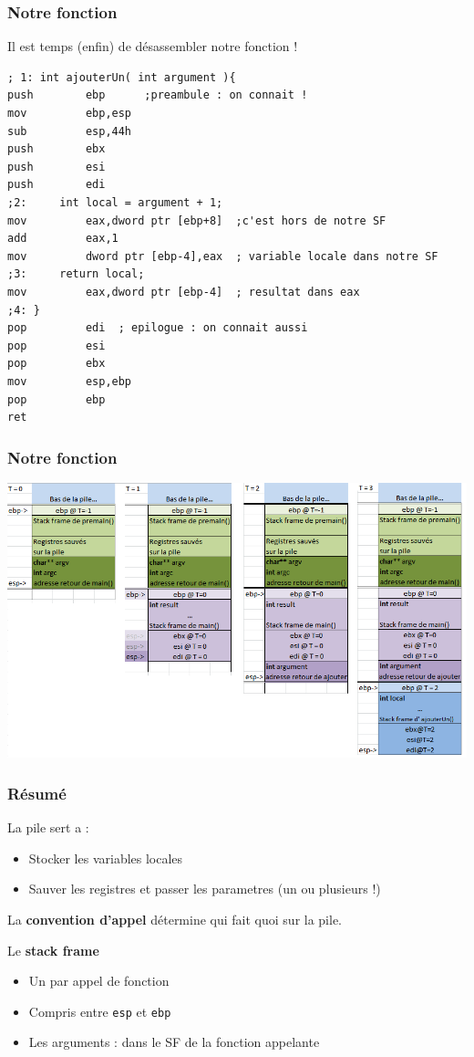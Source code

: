 \documentclass{beamer}
\begin{document}
\begin{frame}[fragile]
\frametitle{Notre fonction}
Il est temps (enfin) de désassembler notre fonction !
\begin{lstlisting}[language={[x86masm]Assembler}, basicstyle={\scriptsize\ttfamily}]
; 1: int ajouterUn( int argument ){
push        ebp      ;preambule : on connait !
mov         ebp,esp  
sub         esp,44h  
push        ebx  
push        esi  
push        edi  
;2: 	int local = argument + 1;
mov         eax,dword ptr [ebp+8]  ;c'est hors de notre SF
add         eax,1  
mov         dword ptr [ebp-4],eax  ; variable locale dans notre SF
;3: 	return local;
mov         eax,dword ptr [ebp-4]  ; resultat dans eax
;4: }
pop         edi  ; epilogue : on connait aussi
pop         esi  
pop         ebx  
mov         esp,ebp  
pop         ebp  
ret  
\end{lstlisting}

\end{frame}

\begin{frame}[fragile]
\frametitle{Notre fonction}

\includegraphics[scale=0.45]{stack.png}
\end{frame}

\begin{frame}[fragile]
\frametitle{Résumé}
\begin{block}{}
La pile sert a :
\begin{itemize}
\item Stocker les variables locales
\item Sauver les registres et passer les parametres (un ou plusieurs !)
\end{itemize}
La \textbf{convention d'appel} détermine qui fait quoi sur la pile.

Le \textbf{stack frame}
\begin{itemize}
\item Un par appel de fonction
\item Compris entre \texttt{esp} et \texttt{ebp}
\item Les arguments : dans le SF de la fonction appelante
\end{itemize}
\end{block}
\end{frame}
\end{document}
